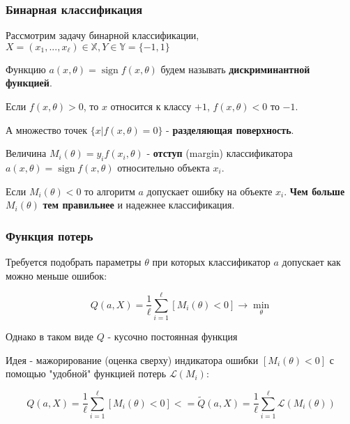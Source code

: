 \documentclass{beamer}
\DeclareMathOperator{\sign}{sign}
\begin{document}
	\begin{frame}
		\frametitle{Бинарная классификация}
		Рассмотрим задачу бинарной классификации, $X=(x_1, ..., x_{\ell}) \in \mathbb{X}, Y \in \mathbb{Y} = \{-1, 1\}$
		
		\vspace{5pt}
		
		Функцию $a(x, \theta) = \sign f(x, \theta)$ будем называть \textbf{дискриминантной функцией}.
		
		\vspace{5pt}
		
		Если $f(x, \theta) > 0$, то $x$ относится к классу $+1$, 
		$f(x, \theta) < 0$ то $-1$. 
		
		\vspace{5pt}
		
		А множество точек $\{x | f(x, \theta) = 0\}$ - \textbf{разделяющая поверхность}.
		
		\vspace{5pt}
		
		Величина $M_i(\theta) = y_i f(x_i, \theta)$ - \textbf{отступ} (margin) классификатора $a(x, \theta) = \sign f(x, \theta)$ относительно объекта $x_i$.
		
		\vspace{5pt}
		
		Если $M_i(\theta) < 0$ то алгоритм $a$ допускает ошибку на объекте $x_i$. \textbf{Чем больше} $M_i(\theta)$ \textbf{тем правильнее} и надежнее классификация.  
	\end{frame} 
	
	\begin{frame}
		\frametitle{Функция потерь}
		Требуется подобрать параметры $\theta$ при которых классификатор $a$ допускает как можно меньше ошибок:
		
		\[
		Q(a, X) = \frac{1}{\ell} \sum_{i=1}^{\ell} [M_i(\theta) < 0] \rightarrow \min_{\theta}
		\]
		
		Однако в таком виде $Q$ - кусочно постоянная функция
		
		\vspace{15pt}
		
		Идея - мажорирование (оценка сверху) индикатора ошибки $[M_i(\theta) < 0]$ с помощью "удобной" функцией потерь $\mathcal{L}(M_i)$:
		
		\[
		Q(a, X) = \frac{1}{\ell} \sum_{i=1}^{\ell} [M_i(\theta) < 0]
		<=
		\widetilde{Q}(a, X) = \frac{1}{\ell} \sum_{i=1}^{\ell} \mathcal{L}(M_i(\theta))
		\]
	\end{frame}
	
\end{document}
